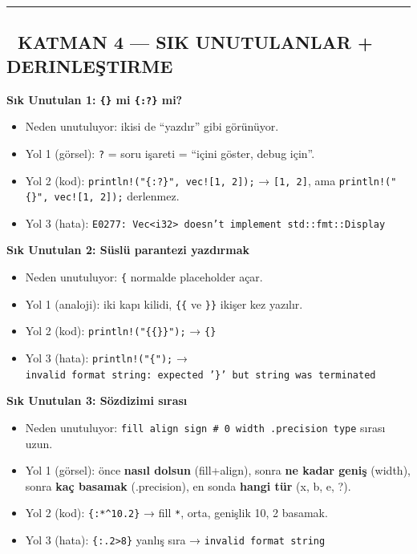 \documentclass[12pt,a4paper]{article}
\begin{document}
\begin{center}\rule{0.5\linewidth}{0.5pt}\end{center}

\subsection{🔴 KATMAN 4 --- SIK UNUTULANLAR + DERINLEŞTIRME}\label{katman-4-—-sik-unutulanlar-derinleştirme-1}

\textbf{Sık Unutulan 1: \texttt{\{\}} mi \texttt{\{:?\}} mi?}

\begin{itemize}
\tightlist
\item
  Neden unutuluyor: ikisi de ``yazdır'' gibi görünüyor.
\item
  Yol 1 (görsel): \texttt{?} = soru işareti = ``içini göster, debug için''.
\item
  Yol 2 (kod): \texttt{println!("\{:?\}",\ vec!{[}1,\ 2{]});} → \texttt{{[}1,\ 2{]}}, ama \texttt{println!("\{\}",\ vec!{[}1,\ 2{]});} derlenmez.
\item
  Yol 3 (hata): \texttt{E0277:\ Vec\textless{}i32\textgreater{}\ doesn't\ implement\ std::fmt::Display}
\end{itemize}

\textbf{Sık Unutulan 2: Süslü parantezi yazdırmak}

\begin{itemize}
\tightlist
\item
  Neden unutuluyor: \texttt{\{} normalde placeholder açar.
\item
  Yol 1 (analoji): iki kapı kilidi, \texttt{\{\{} ve \texttt{\}\}} ikişer kez yazılır.
\item
  Yol 2 (kod): \texttt{println!("\{\{\}\}");} → \texttt{\{\}}
\item
  Yol 3 (hata): \texttt{println!("\{");} → \texttt{invalid\ format\ string:\ expected\ '\}'\ but\ string\ was\ terminated}
\end{itemize}

\textbf{Sık Unutulan 3: Sözdizimi sırası}

\begin{itemize}
\tightlist
\item
  Neden unutuluyor: \texttt{fill\ align\ sign\ \#\ 0\ width\ .precision\ type} sırası uzun.
\item
  Yol 1 (görsel): önce \textbf{nasıl dolsun} (fill+align), sonra \textbf{ne kadar geniş} (width), sonra \textbf{kaç basamak} (.precision), en sonda \textbf{hangi tür} (x, b, e, ?).
\item
  Yol 2 (kod): \texttt{\{:*\^{}10.2\}} → fill \texttt{*}, orta, genişlik 10, 2 basamak.
\item
  Yol 3 (hata): \texttt{\{:.2\textgreater{}8\}} yanlış sıra → \texttt{invalid\ format\ string}
\end{itemize}
\end{document}
